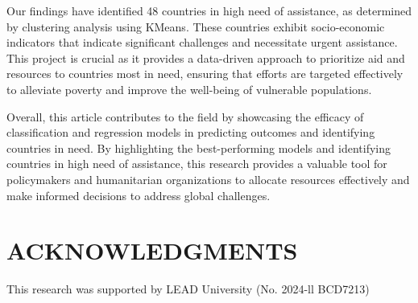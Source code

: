 \documentclass{article}
\begin{document}
\begin{multicols}{2}
Our findings have identified 48 countries in high need of assistance, as determined by clustering analysis using KMeans. These countries exhibit socio-economic indicators that indicate significant challenges and necessitate urgent assistance. This project is crucial as it provides a data-driven approach to prioritize aid and resources to countries most in need, ensuring that efforts are targeted effectively to alleviate poverty and improve the well-being of vulnerable populations.

Overall, this article contributes to the field by showcasing the efficacy of classification and regression models in predicting outcomes and identifying countries in need. By highlighting the best-performing models and identifying countries in high need of assistance, this research provides a valuable tool for policymakers and humanitarian organizations to allocate resources effectively and make informed decisions to address global challenges.

\section{ACKNOWLEDGMENTS}
This research was supported by LEAD University (No. 2024-ll BCD7213) 
\end{multicols}
\end{document}
